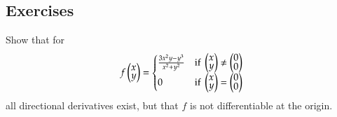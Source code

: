 \subsection{Exercises}
  Show that for
  \[f\Point{x \\ y} = \begin{cases}
   \frac{3x^2y - y^3}{x^2+y^2} & \text{if } \def\arraystretch{0.7}\Point{x \\ y} \neq \Point{0 \\ 0} \\
  0 & \text{if } \def\arraystretch{0.7}\Point{x \\ y} = \Point{0 \\ 0}
  \end{cases}\]
  all directional derivatives exist, but that $f$ is not differentiable at the origin.
